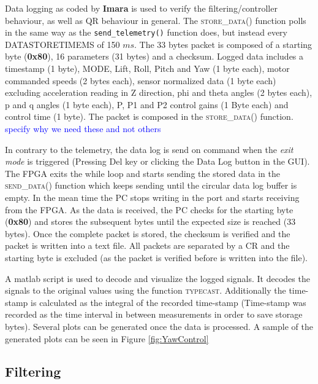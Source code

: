 \documentclass{article}
\newcommand\todo[1]{\textcolor{blue}{#1}} %
\begin{document}
Data logging as coded by \textbf{Imara} is used to verify the filtering/controller behaviour, as well as QR behaviour in general. The \textsc{store\_data()} function polls in the same way as the \texttt{send\_telemetry()} function does, but instead every \textsc{DATASTORETIMEMS} of 150 $ms$. The 33 bytes packet is composed of a starting byte (\textbf{0x80}), 16 parameters (31 bytes) and a checksum. Logged data includes a timestamp (1 byte), MODE, Lift, Roll, Pitch and Yaw (1 byte each), motor commanded speeds (2 bytes each), sensor normalized data (1 byte each) excluding acceleration reading in Z direction, phi and theta angles (2 bytes each), p and q angles (1 byte each), P, P1 and P2 control gains (1 Byte each) and control time (1 byte). The packet is composed in the \textsc{store\_data()} function. \todo{specify why we need these and not others}

In contrary to the telemetry, the data log is send on command when the \emph{exit mode} is triggered (Pressing Del key or clicking the Data Log button in the GUI). The FPGA exits the while loop and starts sending the stored data in the \textsc{send\_data()} function which keeps sending until the circular data log buffer is empty. In the mean time the PC stops writing in the port and starts receiving from the FPGA. As the data is received, the PC checks for the starting byte (\textbf{0x80}) and stores the subsequent bytes until the expected size is reached (33 bytes). Once the complete packet is stored, the checksum is verified and the packet is written into a text file. All packets are separated by a CR and the starting byte is excluded (as the packet is verified before is written into the file).

A matlab script is used to decode and visualize the logged signals. It decodes the signals to the original values using the function \textsc{typecast}. Additionally the time-stamp is calculated as the integral of the recorded time-stamp (Time-stamp was recorded as the time interval in between measurements in order to save storage bytes). Several plots can be generated once the data is processed. A sample of the generated plots can be seen in Figure \ref{fig:YawControl}


\subsection{Filtering}
\label{sec:filtering}
\end{document}
